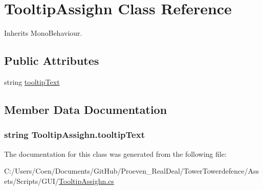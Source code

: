 \hypertarget{class_tooltip_assighn}{}\section{Tooltip\+Assighn Class Reference}
\label{class_tooltip_assighn}


Inherits Mono\+Behaviour.

\subsection*{Public Attributes}
\begin{DoxyCompactItemize}
\item 
string \hyperlink{class_tooltip_assighn_ae9e278f43d257dc67169fd1140700edb}{tooltip\+Text}
\end{DoxyCompactItemize}


\subsection{Member Data Documentation}
\subsubsection[{\texorpdfstring{tooltip\+Text}{tooltipText}}]{\setlength{\rightskip}{0pt plus 5cm}string Tooltip\+Assighn.\+tooltip\+Text}\hypertarget{class_tooltip_assighn_ae9e278f43d257dc67169fd1140700edb}{}\label{class_tooltip_assighn_ae9e278f43d257dc67169fd1140700edb}


The documentation for this class was generated from the following file\+:\begin{DoxyCompactItemize}
\item 
C\+:/\+Users/\+Coen/\+Documents/\+Git\+Hub/\+Proeven\+\_\+\+Real\+Deal/\+Tower\+Towerdefence/\+Assets/\+Scripts/\+G\+U\+I/\hyperlink{_tooltip_assighn_8cs}{Tooltip\+Assighn.\+cs}\end{DoxyCompactItemize}
